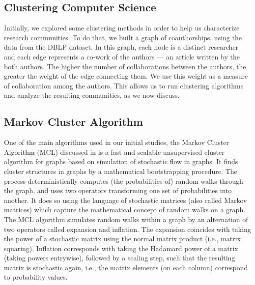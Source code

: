 \documentclass[msc]{ppgccufmg}
\begin{document}


\begin{appendices}
\chapter{Clustering Computer Science}\label{sec:clustering}

Initially, we explored some clustering methods in order to help us characterize research communities. To do that, we built a graph of coauthorships, using the data from the DBLP dataset. In this graph, each node is a distinct researcher and each edge represents a co-work of the authors --- an article written by the both authors. The higher the number of collaborations between the authors, the greater the weight of the edge connecting them. We use this weight as a measure of collaboration among the authors. This allows us to run clustering algorithms and analyze the resulting communities, as we now discuss.

\section{Markov Cluster Algorithm}

One of the main algorithms used in our initial studies, the Markov Cluster Algorithm (MCL) discussed in \citep{mcl} is a fast and scalable unsupervised cluster algorithm for graphs based on simulation of stochastic flow in graphs. It finds cluster structures in graphs by a mathematical bootstrapping procedure. The process deterministically computes (the probabilities of) random walks through the graph, and uses two operators transforming one set of probabilities into another. It does so using the language of stochastic matrices (also called Markov matrices) which capture the mathematical concept of random walks on a graph.
The MCL algorithm simulates random walks within a graph by an alternation of two operators called expansion and inflation. The expansion coincides with taking the power of a stochastic matrix using the normal matrix product (i.e., matrix squaring). Inflation corresponds with taking the Hadamard power of a matrix (taking powers entrywise), followed by a scaling step, such that the resulting matrix is stochastic again, i.e., the matrix elements (on each column) correspond to probability values.


\end{appendices}
\end{document}
